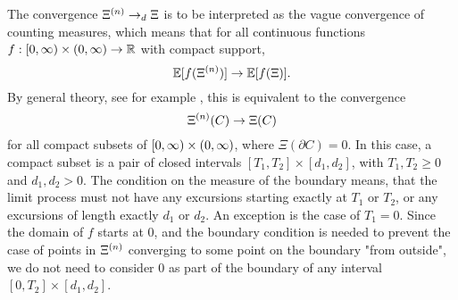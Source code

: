 \begin{note}
	The convergence
	$\Xi^{(n)} \rightarrow_d \Xi$
	is to be interpreted as the vague convergence of counting measures,
	which means that for all continuous functions
	$f: [0, \infty) \times (0, \infty) \rightarrow \mathbb{R}$
	with compact support,
	\begin{equation}
		\mathbb{E}[f(\Xi^{(n)})] \rightarrow \mathbb{E}[f(\Xi)].
	\end{equation}
	By general theory,
	see for example \cite{Kallenberg1990},
	this is equivalent to the convergence
	\begin{equation}
	\Xi^{(n)}(C) \rightarrow \Xi(C)
	\end{equation}
	for all compact subsets of
	$[0, \infty) \times (0, \infty)$,
	where $\Xi(\partial C) = 0$.
	In this case, a compact subset is a pair of closed intervals
	$[T_1, T_2] \times [d_1, d_2]$,
	with $T_1, T_2 \geq 0$
	and $d_1, d_2 > 0$.
	The condition on the measure of the boundary means,
	that the limit process must not have any excursions starting exactly at
	$T_1$ or $T_2$,
	or any excursions of length exactly $d_1$ or $d_2$.
	An exception is the case of $T_1=0$.
	Since the domain of $f$ starts at $0$,
	and the boundary condition is needed to prevent the case of points in $\Xi^{(n)}$ converging to some point on the boundary "from outside",
	we do not need to consider $0$ as part of the boundary of any interval 
	$[0, T_2] \times [d_1, d_2]$.
\end{note}


